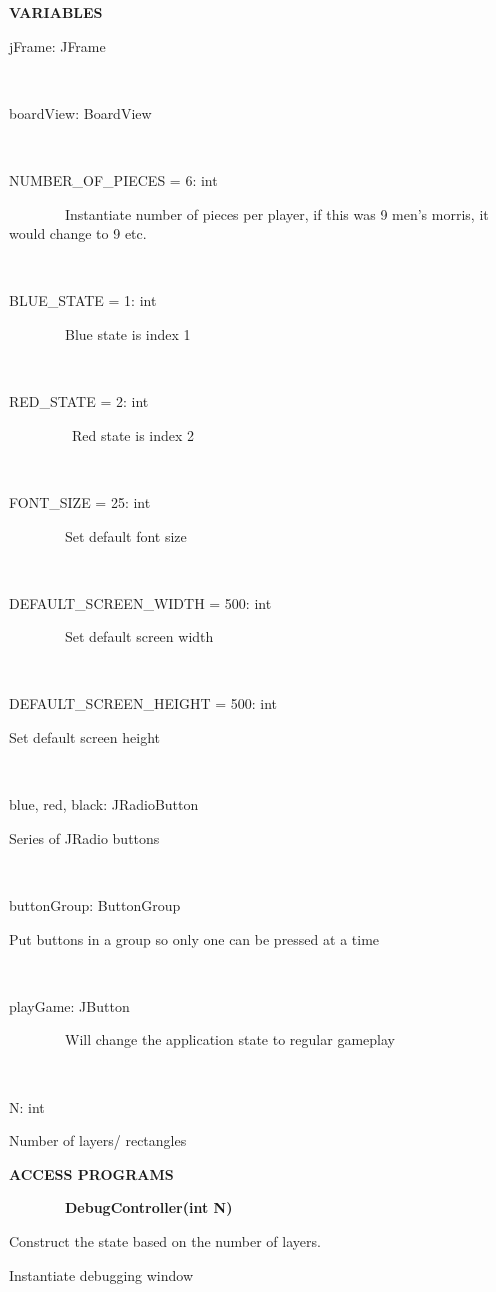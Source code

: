 \documentclass{article}
\begin{document}
{{\textbf{VARIABLES}}

{jFrame: JFrame~~~~~~~~~~~~~~~~~~~~~~~~}

{~~~~~~~~}

{boardView: BoardView}

{~~~~~~~~}

{NUMBER\_OF\_PIECES = 6: int}

{~~~~~~~~Instantiate number of pieces per player, if this was 9 men's morris, it would change to 9 etc.}

{~~~~~~~~}

{BLUE\_STATE = 1: int}

{~~~~~~~~Blue state is index 1}

{~~~~~~~~}

{RED\_STATE = 2: int}

{~~~~~~~~~Red state is index 2}

{~~~~~~~~}

{FONT\_SIZE = 25: int}

{~~~~~~~~Set default font size}

{~~~~~~~~}

{DEFAULT\_SCREEN\_WIDTH = 500: int}

{~~~~~~~~Set default screen width}

{~}

{DEFAULT\_SCREEN\_HEIGHT = 500: int}

{Set default screen height}

{~~~~~~~~}

{blue, red, black: JRadioButton}

{Series of JRadio buttons~~~~~~~~}

{~~~~~~~~}

{buttonGroup: ButtonGroup}

{Put buttons in a group so only one can be pressed at a time}

{~~~~~~~~}

{playGame: JButton}

{~~~~~~~~Will change the application state to regular gameplay}

{~}

{N: int}

{Number of layers/ rectangles}

{}

{\textbf{ACCESS PROGRAMS}}

{~~~~~~~~\textbf{DebugController(int N)}}

{Construct the state based on the number of layers. }

{Instantiate debugging window}

}
\end{document}
